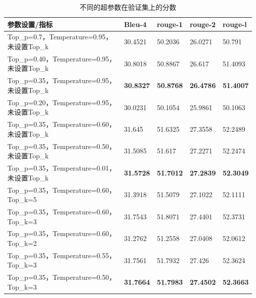 \documentclass[
    decl-page,  %
    ,fontset = win, %
  ]{njuthesis}
\begin{document}
\begin{table}[]
\renewcommand\arraystretch{1.5}
\caption{不同的超参数在验证集上的分数}
\label{scorecanshu}
\begin{tabular}{|l|l|l|l|l|}
\hline
\textbf{参数设置/指标}                       & \textbf{Bleu-4} & \textbf{rouge-1} & \textbf{rouge-2}   & \textbf{rouge-l} \\ \hline
Top\_p=0.7，Temperature=0.95，未设置Top\_k  & 30.4521         & 50.2036          & 26.0271            & 50.791           \\ \hline
Top\_p=0.40，Temperature=0.95，未设置Top\_k & 30.8018         & 50.8867          & 26.617             & 51.4093          \\ \hline
Top\_p=0.35，Temperature=0.95，未设置Top\_k & \textbf{30.8327}         & \textbf{50.8768}          & \textbf{26.4786}            & \textbf{51.4007}          \\ \hline
Top\_p=0.20，Temperature=0.95，未设置Top\_k & 30.0231         & 50.1054          & 25.9861            & 50.1063          \\ \hline
Top\_p=0.35，Temperature=0.60，未设置Top\_k & 31.645          & 51.6325          & 27.3558            & 52.2489          \\ \hline
Top\_p=0.35，Temperature=0.50，未设置Top\_k & 31.5085         & 51.617           & 27.2271            & 52.2474          \\ \hline
Top\_p=0.35，Temperature=0.01，未设置Top\_k & \textbf{31.5728}      & \textbf{51.7012}       & \textbf{27.2839} & \textbf{52.3049}      \\ \hline
Top\_p=0.35，Temperature=0.60，Top\_k=5  & 31.3918         & 51.5079          & 27.1022            & 52.1111          \\ \hline
Top\_p=0.35，Temperature=0.60，Top\_k=3  & 31.7543         & 51.8071          & 27.4401            & 52.3731          \\ \hline
Top\_p=0.35，Temperature=0.60，Top\_k=2  & 31.2762         & 51.2558          & 27.0408            & 52.0612          \\ \hline
Top\_p=0.35，Temperature=0.55，Top\_k=3  & 31.7561         & 51.7932          & 27.426             & 52.3624          \\ \hline
Top\_p=0.35，Temperature=0.50，Top\_k=3  & \textbf{31.7664}         & \textbf{51.7983}          & \textbf{27.4502}            & \textbf{52.3663}          \\ \hline
\end{tabular}
\end{table}
\end{document}
